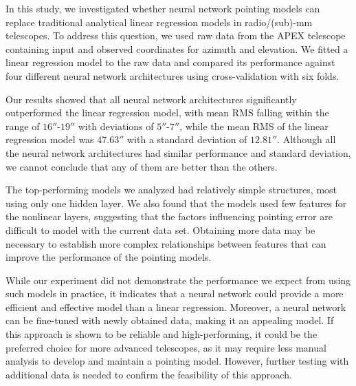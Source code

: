 In this study, we investigated whether neural network pointing models can replace traditional analytical linear regression models in radio/(sub)-mm telescopes.
To address this question, we used raw data from the APEX telescope containing input and observed coordinates for azimuth and elevation.
We fitted a linear regression model to the raw data and compared its performance against four different neural network architectures using cross-validation with six folds.

Our results showed that all neural network architectures significantly outperformed the linear regression model, with mean RMS falling within the range of $16''$-$19''$ with deviations of $5''$-$7''$, while the mean RMS of the linear regression model was $47.63''$ with a standard deviation of $12.81''$.
Although all the neural network architectures had similar performance and standard deviation, we cannot conclude that any of them are better than the others.

The top-performing models we analyzed had relatively simple structures, most using only one hidden layer.
We also found that the models used few features for the nonlinear layers, suggesting that the factors influencing pointing error are difficult to model with the current data set.
Obtaining more data may be necessary to establish more complex relationships between features that can improve the performance of the pointing models.

While our experiment did not demonstrate the performance we expect from using such models in practice, it indicates that a neural network could provide a more efficient and effective model than a linear regression.
Moreover, a neural network can be fine-tuned with newly obtained data, making it an appealing model.
If this approach is shown to be reliable and high-performing, it could be the preferred choice for more advanced telescopes, as it may require less manual analysis to develop and maintain a pointing model.
However, further testing with additional data is needed to confirm the feasibility of this approach.


